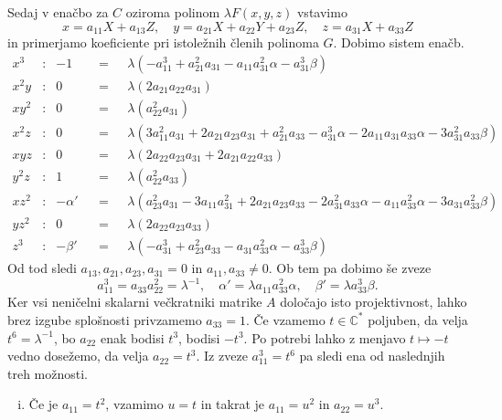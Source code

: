 \documentclass[mat1]{fmfdelo}
\numberwithin{equation}{section}
\newcommand{\CM}{\mathbb C ^*}
\newcommand{\inv}{^{-1}}
\theoremstyle{definition}
\begin{document}
\begin{dokaz}
    Sedaj v enačbo za $C$ oziroma polinom $\lambda F(x,y,z)$ vstavimo 
    \[
        x = a_{11}X + a_{13}Z, \quad y = a_{21}X + a_{22}Y + a_{23}Z, \quad z = a_{31}X + a_{33}Z 
    \]
    in primerjamo koeficiente pri istoležnih členih polinoma $G$.
    Dobimo sistem enačb.
    \begin{align*}
        x^3 &: & -1 && = \text{ }& \lambda (-a_{11}^3 + a_{21}^2 a_{31} - a_{11} a_{31}^2 \alpha - a_{31}^3 \beta) \\
        x^2y &: & 0 && = \text{ }& \lambda (2 a_{21} a_{22} a_{31}) \\
        xy^2 &: & 0 && = \text{ }& \lambda (a_{22}^2 a_{31}) \\
        x^2z &: & 0 && = \text{ }& \lambda (3 a_{11}^2 a_{31} + 2 a_{21} a_{23} a_{31} + a_{21}^2 a_{33} - 
        a_{31}^3 \alpha - 2 a_{11} a_{31} a_{33} \alpha - 3 a_{31}^2 a_{33} \beta) \\
        xyz  &: & 0 && = \text{ }& \lambda (2 a_{22} a_{23} a_{31} + 2 a_{21} a_{22} a_{33}) \\
        y^2z &: & 1 && = \text{ }& \lambda (a_{22}^2 a_{33}) \\
        xz^2 &: & -\alpha' && = \text{ }& \lambda (a_{23}^2 a_{31} - 3 a_{11} a_{31}^2 + 2 a_{21} a_{23} a_{33} - 
        2 a_{31}^2 a_{33} \alpha - a_{11} a_{33}^2 \alpha - 3 a_{31} a_{33}^2 \beta) \\
        yz^2 &: & 0 && = \text{ }& \lambda (2 a_{22} a_{23} a_{33} ) \\
        z^3 &: & -\beta' && = \text{ }& \lambda (-a_{31}^3 + a_{23}^2 a_{33} - a_{31} a_{33}^2 \alpha - a_{33}^3 \beta)
    \end{align*}
    Od tod sledi $a_{13}, a_{21}, a_{23}, a_{31} = 0$ in $a_{11}, a_{33} \neq 0$. Ob tem pa dobimo še zveze
    \[
        a_{11}^3 = a_{33}a_{22}^2 = \lambda\inv, \quad \alpha' = \lambda a_{11}a_{33}^2 \alpha, \quad \beta' = \lambda a_{33}^3 \beta.
    \]
    Ker vsi neničelni skalarni večkratniki matrike $A$ določajo isto projektivnost, lahko brez izgube splošnosti privzamemo $a_{33} = 1$. Če vzamemo $t \in \CM$ poljuben, da velja $t^6 = \lambda\inv$, bo $a_{22}$ enak bodisi $t^3$, bodisi $-t^3$. Po potrebi lahko z menjavo $t \mapsto -t$ vedno dosežemo, da velja $a_{22} = t^3$. Iz zveze $a_{11}^3 = t^6$ pa sledi ena od naslednjih treh možnosti.
    \begin{enumerate}[(i)]
        \item Če je $a_{11} = t^2$, vzamimo $u = t$ in takrat je $a_{11} = u^2$ in $a_{22} = u^3$.

\end{enumerate}
\end{dokaz}
\end{document}
